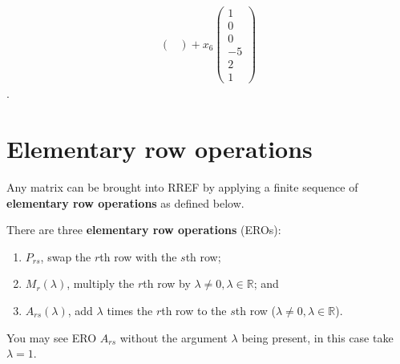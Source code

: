 \begin{example}
\begin{align*}
\begin{pmatrix}
        \end{pmatrix}
        +x_6\begin{pmatrix}
            1\\0\\0\\-5\\2\\1
        \end{pmatrix}
    \end{align*}
    .
\end{example}

\section{Elementary row operations}

\begin{theorem}
    Any matrix can be brought into RREF by applying a finite sequence of \textbf{elementary row operations} as defined below.\label{the:rrefbyero}
\end{theorem}

\begin{definition}
    There are three \textbf{elementary row operations} (EROs):
    \begin{enumerate}
        \item $P_{rs}$, swap the $r$th row with the $s$th row;
        \item $M_r(\lambda)$, multiply the $r$th row by $\lambda\neq0,\lambda\in\mathbb R$; and
        \item $A_{rs}(\lambda)$, add $\lambda$ times the $r$th row to the $s$th row ($\lambda\neq0,\lambda\in\mathbb R$).
    \end{enumerate}
\end{definition}

\begin{remark}
    You may see ERO $A_{rs}$ without the argument $\lambda$ being present, in this case take $\lambda=1$.
\end{remark}

